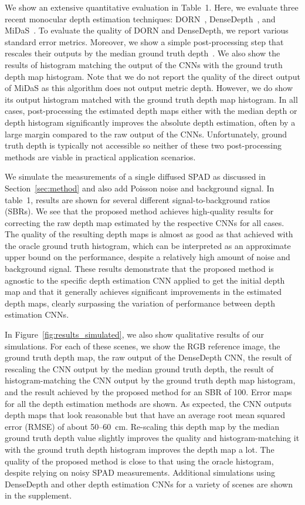 We show an extensive quantitative evaluation in Table~1. Here, we evaluate three recent monocular depth estimation techniques: DORN~\cite{Fu2018}, DenseDepth~\cite{Alhashim2018}, and MiDaS~\cite{Lasinger:2019}. To evaluate the quality of DORN and DenseDepth, we report various standard error metrics. Moreover, we show a simple post-processing step that rescales their outputs by the median ground truth depth~\cite{Alhashim2018}. We also show the results of histogram matching the output of the CNNs with the ground truth depth map histogram. Note that we do not report the quality of the direct output of MiDaS as this algorithm does not output metric depth. However, we do show its output histogram matched with the ground truth depth map histogram. In all cases, post-processing the estimated depth maps either with the median depth or depth histogram significantly improves the absolute depth estimation, often by a large margin compared to the raw output of the CNNs. Unfortunately, ground truth depth is typically not accessible so neither of these two post-processing methods are viable in practical application scenarios. 

We simulate the measurements of a single diffused SPAD as discussed in Section~\ref{sec:method} and also add Poisson noise and background signal. In table~1, results are shown for several different signal-to-background ratios (SBRs). We see that the proposed method achieves high-quality results for correcting the raw depth map estimated by the respective CNNs for all cases. The quality of the resulting depth maps is almost as good as that achieved with the oracle ground truth histogram, which can be interpreted as an approximate upper bound on the performance, despite a relatively high amount of noise and background signal. These results demonstrate that the proposed method is agnostic to the specific depth estimation CNN applied to get the initial depth map and that it generally achieves significant improvements in the estimated depth maps, clearly surpassing the variation of performance between depth estimation CNNs.


In Figure~\ref{fig:results_simulated}, we also show qualitative results of our simulations. For each of these scenes, we show the RGB reference image, the ground truth depth map, the raw output of the DenseDepth CNN, the result of rescaling the CNN output by the median ground truth depth, the result of histogram-matching the CNN output by the ground truth depth map histogram, and the result achieved by the proposed method for an SBR of 100. Error maps for all the depth estimation methods are shown. As expected, the CNN outputs depth maps that look reasonable but that have an average root mean squared error (RMSE) of about 50--60~cm. Re-scaling this depth map by the median ground truth depth value slightly improves the quality and histogram-matching it with the ground truth depth histogram improves the depth map a lot. The quality of the proposed method is close to that using the oracle histogram, despite relying on noisy SPAD measurements. Additional simulations using DenseDepth and other depth estimation CNNs for a variety of scenes are shown in the supplement.


